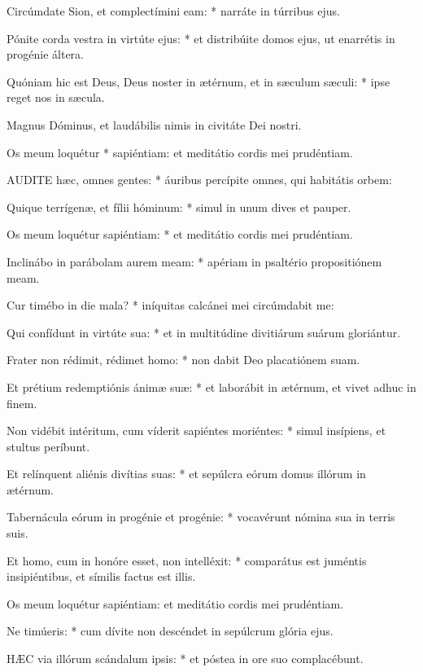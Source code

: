 Circúmdate Sion, et complectímini eam: * narráte in túrribus ejus.

Pónite corda vestra in virtúte ejus: * et distribúite domos ejus, ut enarrétis in progénie áltera.

Quóniam hic est Deus, Deus noster in ætérnum, et in sæculum sæculi: * ipse reget nos in sæcula.

 Magnus Dóminus, et laudábilis nimis in civitáte Dei nostri.

 Os meum loquétur * sapiéntiam: et meditátio cordis mei prudéntiam.


\lettrine[lines=2]{A}{UDITE} hæc, omnes gentes: * áuribus percípite omnes, qui habitátis orbem:

Quique terrígenæ, et fílii hóminum: * simul in unum dives et pauper.

Os meum loquétur sapiéntiam: * et meditátio cordis mei prudéntiam.

Inclinábo in parábolam aurem meam: * apériam in psaltério propositiónem meam.

Cur timébo in die mala? * iníquitas calcánei mei circúmdabit me:

Qui confídunt in virtúte sua: * et in multitúdine divitiárum suárum gloriántur.

Frater non rédimit, rédimet homo: * non dabit Deo placatiónem suam.

Et prétium redemptiónis ánimæ suæ: * et laborábit in ætérnum, et vivet adhuc in finem.

Non vidébit intéritum, cum víderit sapiéntes moriéntes: * simul insípiens, et stultus períbunt.

Et relínquent aliénis divítias suas: * et sepúlcra eórum domus illórum in ætérnum.

Tabernácula eórum in progénie et progénie: * vocavérunt nómina sua in terris suis.

Et homo, cum in honóre esset, non intelléxit: * comparátus est juméntis insipiéntibus, et símilis factus est illis.

 Os meum loquétur sapiéntiam: et meditátio cordis mei prudéntiam.

 Ne timúeris: * cum dívite non descéndet in sepúlcrum glória ejus.


\lettrine[lines=2]{H}{ÆC} via illórum scándalum ipsis: * et póstea in ore suo complacébunt.

